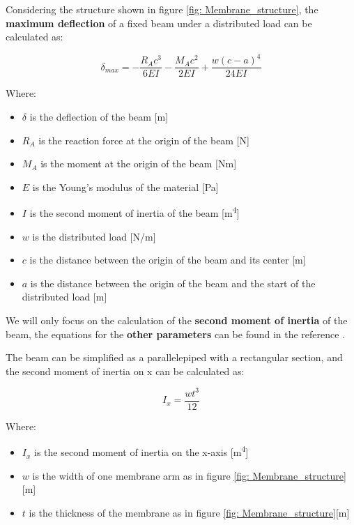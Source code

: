\begin{samepage}
    Considering the structure shown in figure \ref{fig: Membrane_structure}, the \textbf{maximum deflection} of a fixed beam under a distributed load can be calculated as:
    \nopagebreak

    \begin{equation}
        \delta_{max} = -\frac{R_A c^3}{6 E I} - \frac{M_A c^2}{2EI} + \frac{w (c-a)^4}{24 EI}
        \label{eq: Beam_deflection}
    \end{equation}
    \nopagebreak

    Where:
    \nopagebreak

    \begin{itemize}
        \item $\delta$ is the deflection of the beam [m]
        \item $R_A$ is the reaction force at the origin of the beam [N]
        \item $M_A$ is the moment at the origin of the beam [Nm]
        \item $E$ is the Young's modulus of the material [Pa]
        \item $I$ is the second moment of inertia of the beam [m\textsuperscript{4}]
        \item $w$ is the distributed load [N/m]
        \item $c$ is the distance between the origin of the beam and its center [m]
        \item $a$ is the distance between the origin of the beam and the start of the distributed load [m]
    \end{itemize}
\end{samepage}

We will only focus on the calculation of the \textbf{second moment of inertia} of the beam, the equations for the \textbf{other parameters} can be found in the reference \cite{statics_fixed_beam}.

\begin{samepage}
    The beam can be simplified as a parallelepiped with a rectangular section, and the second moment of inertia on x can be calculated as:
    \nopagebreak
    
    \begin{equation}
        I_x = \frac{w t^3}{12}
        \label{eq: Beam_inertia}
    \end{equation}
    \nopagebreak

    Where:
    \nopagebreak
    
    \begin{itemize}
        \item $I_x$ is the second moment of inertia on the x-axis [m\textsuperscript{4}]
        \item $w$ is the width of one membrane arm as in figure \ref{fig: Membrane_structure}[m]
        \item $t$ is the thickness of the membrane as in figure \ref{fig: Membrane_structure}[m]
    \end{itemize}
\end{samepage}

